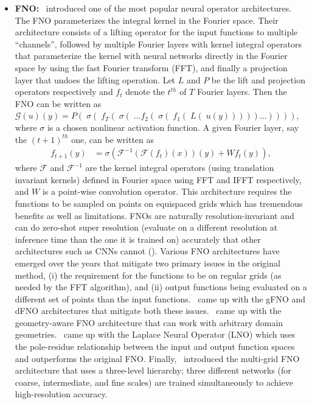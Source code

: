 \documentclass[12pt]{exam}
\def\G{\mathcal{G}}
\begin{document}
\begin{questions}
\begin{itemize}
\item {\bf FNO:}~\citep{li2020fourier} introduced one of the most popular neural operator architectures. The FNO parameterizes the integral kernel in the Fourier space. Their architecture consists of a lifting operator for the input functions to multiple ``channels'', followed by multiple Fourier layers with kernel integral operators that parameterize the kernel with neural networks directly in the Fourier space by using the fast Fourier transform (FFT), and finally a projection layer that undoes the lifting operation. Let $L$ and $P$ be the lift and projection operators respectively and $f_t$ denote the $t^{th}$ of $T$ Fourier layers. Then the FNO can be written as $\G(u)(y) = P(\; \sigma(\; f_T(\; \sigma(\; \dots f_2(\; \sigma(\; f_1(\; L(\; u(y))))) \dots ))))$, where $\sigma$ is a chosen nonlinear activation function. A given Fourier layer, say the $(t+1)^{th}$ one, can be written as
\begin{align}
f_{t+1}(y) &= \sigma\left(\mathcal{F}^{-1}\left( \mathcal{F}(f_t)(x) \right)(y) +  W f_t(y) \right),
\end{align}
where $\mathcal{F}$ and $\mathcal{F}^{-1}$ are the kernel integral operators (using translation invariant kernels) defined in Fourier space using FFT and IFFT respectively, and $W$ is a point-wise convolution operator. This architecture requires the functions to be sampled on points on equispaced grids which has tremendous benefits as well as limitations. FNOs are naturally resolution-invariant and can do zero-shot super resolution (evaluate on a different resolution at inference time than the one it is trained on) accurately that other architectures such as CNNs cannot (\citep[Section 4]{li2020fourier}). Various FNO architectures have emerged over the years that mitigate two primary issues in the original method, (i) the requirement for the functions to be on regular grids (as needed by the FFT algorithm), and (ii) output functions being evaluated on a different set of points than the input functions.~\citep{lu2022comprehensive} came up with the gFNO and dFNO architectures that mitigate both these issues.~\citep{li2023fourier} came up with the geometry-aware FNO architecture that can work with arbitrary domain geometries.~\citep{cao2024laplace} came up with the Laplace Neural Operator (LNO) which uses the pole-residue relationship between the input and output function spaces and outperforms the original FNO. Finally,~\citep{guo2024mgfno} introduced the multi-grid FNO architecture that uses a three-level hierarchy; three different networks (for coarse, intermediate, and fine scales) are trained simultaneously to achieve high-resolution accuracy.


\end{itemize}
\end{questions}
\end{document}
